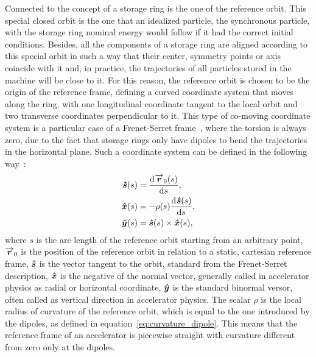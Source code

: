     Connected to the concept of a storage ring is the one of the reference orbit. This special closed orbit is the one that an idealized particle, the synchronous particle, with the storage ring nominal energy would follow if it had the correct initial conditions. Besides, all the components of a storage ring are aligned according to this special orbit in such a way that their center, symmetry points or axis coincide with it and, in practice, the trajectories of all particles stored in the machine will be close to it. For this reason, the reference orbit is chosen to be the origin of the reference frame, defining a curved coordinate system that moves along the ring, with one longitudinal coordinate tangent to the local orbit and two transverse coordinates perpendicular to it. This type of co-moving coordinate system is a particular case of a Frenet-Serret frame~\cite{Frenet1852,Serret1851,wiki2017}, where the torsion is always zero, due to the fact that storage rings only have dipoles to bend the trajectories in the horizontal plane. Such a coordinate system can be defined in the following way~\cite[chap. 2]{Lee1999}:
    \begin{align}\nonumber
        \boldsymbol{\hat s}(s) &= \frac{\mathrm{d}^{{}}\overrightarrow{\boldsymbol{r}}_0(s)}{\mathrm{d} s^{{}}},\\
        \boldsymbol{\hat x}(s) &= -\rho(s)\frac{\mathrm{d}^{{}}\boldsymbol{\hat s}(s)}{\mathrm{d} s^{{}}},\\\nonumber
        \boldsymbol{\hat y}(s) &= \boldsymbol{\hat s}(s) \times \boldsymbol{\hat x}(s),
    \end{align}
    where $s$ is the arc length of the reference orbit starting from an arbitrary point, $\overrightarrow{\boldsymbol{r}}_0$ is the position of the reference orbit in relation to a static, cartesian reference frame, $\boldsymbol{\hat s}$ is the vector tangent to the orbit, standard from the Frenet-Serret description, $\boldsymbol{\hat x}$ is the negative of the normal vector, generally called in accelerator physics as radial or horizontal coordinate, $\boldsymbol{\hat y}$ is the standard binormal versor, often called as vertical direction in accelerator physics. The scalar $\rho$ is the local radius of curvature of the reference orbit, which is equal to the one introduced by the dipoles, as defined in equation~\eqref{eq:curvature_dipole}. This means that the reference frame of an accelerator is piecewise straight with curvature different from zero only at the dipoles.


